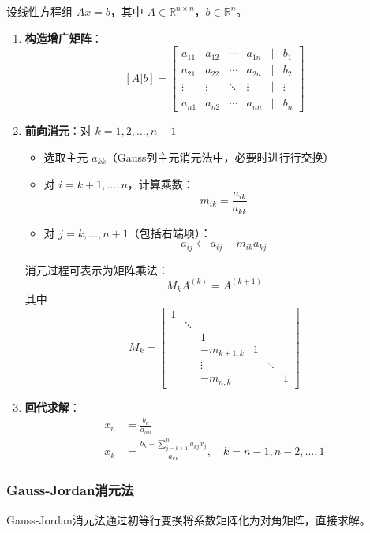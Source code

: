设线性方程组 $Ax = b$，其中 $A \in \mathbb{R}^{n \times n}$，$b \in \mathbb{R}^{n}$。
\begin{enumerate}
    \item \textbf{构造增广矩阵}：
    \[
    [A|b] = \begin{bmatrix}
    a_{11} & a_{12} & \cdots & a_{1n} & | & b_1 \\
    a_{21} & a_{22} & \cdots & a_{2n} & | & b_2 \\
    \vdots & \vdots & \ddots & \vdots & | & \vdots \\
    a_{n1} & a_{n2} & \cdots & a_{nn} & | & b_n
    \end{bmatrix}
    \]
    
    \item \textbf{前向消元}：对 $k = 1, 2, \ldots, n-1$
    \begin{itemize}
        \item 选取主元 $a_{kk}$（Gauss列主元消元法中，必要时进行行交换）
        \item 对 $i = k+1, \ldots, n$，计算乘数：
        \[
        m_{ik} = \frac{a_{ik}}{a_{kk}}
        \]
        \item 对 $j = k, \ldots, n+1$（包括右端项）：
        \[
        a_{ij} \leftarrow a_{ij} - m_{ik}a_{kj}
        \]
    \end{itemize}
    
    消元过程可表示为矩阵乘法：
    \[
    M_k A^{(k)} = A^{(k+1)}
    \]
    其中
    \[
    M_k = \begin{bmatrix}
    1 & & & & \\
    & \ddots & & & \\
    & & 1 & & \\
    & & -m_{k+1,k} & 1 & \\
    & & \vdots & & \ddots \\
    & & -m_{n,k} & & & 1
    \end{bmatrix}
    \]
    
    \item \textbf{回代求解}：
    \begin{align*}
    x_n &= \frac{b_n}{a_{nn}} \\
    x_k &= \frac{b_k - \sum_{j=k+1}^n a_{kj}x_j}{a_{kk}}, \quad k = n-1, n-2, \ldots, 1
    \end{align*}
\end{enumerate}


\subsubsection{Gauss-Jordan消元法}
Gauss-Jordan消元法通过初等行变换将系数矩阵化为对角矩阵，直接求解。

